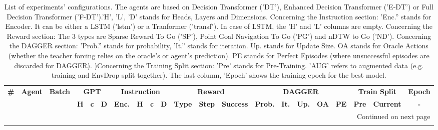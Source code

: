 \begin{longtable}{@{\hskip3pt}c@{\hskip3pt}c@{\hskip3pt}c@{\hskip3pt}c@{\hskip3pt}c@{\hskip3pt}c@{\hskip3pt}c@{\hskip3pt}c@{\hskip3pt}c@{\hskip3pt}c@{\hskip3pt}c@{\hskip3pt}c@{\hskip3pt}c@{\hskip3pt}c@{\hskip3pt}c@{\hskip3pt}c@{\hskip3pt}c@{\hskip3pt}c@{\hskip3pt}c@{\hskip3pt}c@{\hskip3pt}c}
\caption{List of experiments' configurations. \newline The agents are based on Decision Transformer ('DT'), Enhanced Decision Transformer ('E-DT') or Full Decision Transformer ('F-DT').\newline 'H', 'L', 'D' stands for Heads, Layers and Dimensions. \newline Concerning the Instruction section: 'Enc.'' stands for Encoder. It can be either a LSTM ('lstm') or a Tranformer ('transf'). In case of LSTM, the 'H' and 'L' columns are empty. \newline Concerning the Reward section: The 3 types are Sparse Reward To Go ('SP'), Point Goal Navigation To Go ('PG') and nDTW to Go ('ND'). \newline Concerning the DAGGER section: 'Prob.'' stands for probability, 'It.'' stands for iteration. Up. stands for Update Size. OA stands for Oracle Actions (whether the teacher forcing relies on the oracle's or agent's prediction). PE stands for Perfect Episodes (where unsuccessful episodes are discarded for DAGGER). )\newline Concerning the Training Split section: 'Pre' stands for Pre-Training. 'AUG' refers to augmented data (e.g. training and EnvDrop split together). The last column, 'Epoch' shows the training epoch for the best model.}\\
\toprule
\textbf{\#} & \textbf{Agent} & \textbf{Batch} & \multicolumn{3}{c}{\textbf{GPT}} & \multicolumn{4}{c}{\textbf{Instruction}} & \multicolumn{3}{c}{\textbf{Reward}} & \multicolumn{5}{c}{\textbf{DAGGER}} & \multicolumn{2}{c}{\textbf{Train Split}} & \textbf{Epoch} \\
 \textbf{~} &     \textbf{~} &     \textbf{~} &   \textbf{H} & \textbf{c} & \textbf{D} &        \textbf{Enc.} & \textbf{H} & \textbf{c} & \textbf{D} &   \textbf{Type} & \textbf{Step} & \textbf{Success} &  \textbf{Prob.} & \textbf{It.} & \textbf{Up.} & \textbf{OA} & \textbf{PE} &         \textbf{Pre} & \textbf{Current} &     \textbf{-} \\
\midrule
\endhead
\midrule
\multicolumn{21}{r}{{Continued on next page}} \\
\midrule
\endfoot


\end{longtable}
